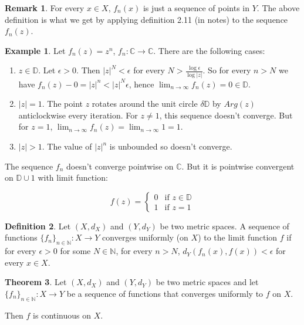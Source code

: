 \documentclass[12pt,a4paper]{article}
\theoremstyle{definition}
\newtheorem{definition}{Definition}[subsection]
\newtheorem{theorem}[definition]{Theorem}
\newtheorem{example}[definition]{Example}
\newtheorem*{remark}{Remark}
\begin{document}
\begin{remark}
	For every $x \in X$, $f_n(x)$ is just a sequence of points in $Y$. The above definition is what we get by applying definition 2.11 (in notes) to the sequence $f_n(z)$.
\end{remark}

\begin{example}
	Let $f_n(z) = z^n$, $f_n: \mathbb{C} \rightarrow \mathbb{C}$. There are the following cases:

	\begin{enumerate}
		\item $z \in \mathbb{D}$. Let $\epsilon > 0$. Then $|z|^N < \epsilon$ for every $N > \frac{\log \epsilon}{\log |z|}$. So for every $n > N$ we have $f_n(z) - 0 = |z|^n < |z|^N \epsilon$, hence $\lim_{n \rightarrow \infty} f_n(z) = 0 \in \mathbb{D}$.
		\item $|z| = 1$. The point $z$ rotates around the unit circle $\delta \mathbb{D}$ by $Arg(z)$ anticlockwise every iteration. For $z \ne 1$, this sequence doesn't converge. But for $z = 1$, $\lim_{n \rightarrow \infty} f_n(z) = \lim_{n \rightarrow \infty} 1 = 1$.
		\item $|z| > 1$. The value of $|z|^n$ is unbounded so doesn't converge.
	\end{enumerate}

	The sequence $f_n$ doesn't converge pointwise on $\mathbb{C}$. But it is pointwise convergent on $\mathbb{D} \cup {1}$ with limit function:

	\begin{equation}
		f(z) =
		\begin{cases}
			0 & \text{if } z \in \mathbb{D}\\
			1 & \text{if } z = 1
		\end{cases}
	\end{equation}
\end{example}

\begin{definition}
	Let $(X, d_X)$ and $(Y, d_Y)$ be two metric spaces. A sequence of functions ${\{f_n\}}_{n \in \mathbb{N}}: X \rightarrow Y$ converges uniformly (on $X$) to the limit function $f$ if for every $\epsilon > 0$ for some $N \in \mathbb{N}$, for every $n > N$, $d_Y(f_n(x), f(x)) < \epsilon$ for every $x \in X$.
\end{definition}

\begin{theorem}
	Let $(X, d_X)$ and $(Y, d_Y)$ be two metric spaces and let ${\{f_n\}}_{n \in \mathbb{N}}: X \rightarrow Y$ be a sequence of functions that converges uniformly to $f$ on $X$.

	Then $f$ is continuous on $X$.
\end{theorem}
\end{document}
